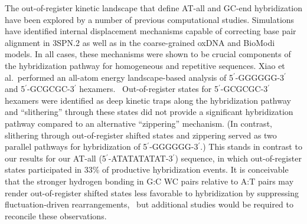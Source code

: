 \documentclass[journal=jpcbfk,manuscript=article]{achemso}
\begin{document}



The out-of-register kinetic landscape that define AT-all and GC-end hybridization have been explored by a number of previous computational studies. Simulations have identified internal displacement mechanisms capable of correcting base pair alignment in 3SPN.2 \citep{Hinckley2014Coarse-grainedEffects} as well as in the coarse-grained oxDNA \citep{Romano2013DNADependence} and BioModi \citep{Markegard2015} models. In all cases, these mechanisms were shown to be crucial components of the hybridization pathway for homogeneous and repetitive sequences. Xiao et al.\ performed an all-atom energy landscape-based analysis of 5$^\prime$-GGGGGG-3$^\prime$ and 5$^\prime$-GCGCGC-3$^\prime$ hexamers.~\citep{Xiao2019} Out-of-register states for 5$^\prime$-GCGCGC-3$^\prime$ hexamers were identified as deep kinetic traps along the hybridization pathway and ``slithering'' through these states did not provide a significant hybridization pathway compared to an alternative ``zippering'' mechanism. (In contrast, slithering through out-of-register shifted states and zippering served as two parallel pathways for hybridization of 5$^\prime$-GGGGGG-3$^\prime$.) This stands in contrast to our results for our AT-all (5$^\prime$-ATATATATAT-3$^\prime$) sequence, in which out-of-register states participated in 33\% of productive hybridization events. It is conceivable that the stronger hydrogen bonding in G:C WC pairs relative to A:T pairs may render out-of-register shifted states less favorable to hybridization by suppressing fluctuation-driven rearrangements,~\citep{Yakovchuk2006Base-stackingHelix,Zacharias2020Base-PairingFormation} but additional studies would be required to reconcile these observations.
\end{document}
